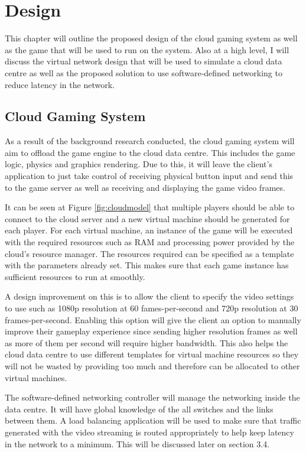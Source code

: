 \chapter{Design}
\label{chapter3}
This chapter will outline the proposed design of the cloud gaming system as well as the game that will be used to run on the system. Also at a high level, I will discuss the virtual network design that will be used to simulate a cloud data centre as well as the proposed solution to use software-defined networking to reduce latency in the network.

\section{Cloud Gaming System}
As a result of the background research conducted, the cloud gaming system will aim to offload the game engine to the cloud data centre. This includes the game logic, physics and graphics rendering. Due to this, it will leave the client's application to just take control of receiving physical button input and send this to the game server as well as receiving and displaying the game video frames.
\newline
\par
It can be seen at Figure \ref{fig:cloudmodel} that multiple players should be able to connect to the cloud server and a new virtual machine should be generated for each player. For each virtual machine, an instance of the game will be executed with the required resources such as RAM and processing power provided by the cloud's resource manager. The resources required can be specified as a template with the parameters already set. This makes sure that each game instance has sufficient resources to run at smoothly.
\newline
\par
A design improvement on this is to allow the client to specify the video settings to use such as 1080p resolution at 60 fames-per-second and 720p resolution at 30 frames-per-second. Enabling this option will give the client an option to manually improve their gameplay experience since sending higher resolution frames as well as more of them per second will require higher bandwidth. This also helps the cloud data centre to use different templates for virtual machine resources so they will not be wasted by providing too much and therefore can be allocated to other virtual machines.
\newline
\par
The software-defined networking controller will manage the networking inside the data centre. It will have global knowledge of the all switches and the links between them. A load balancing application will be used to make sure that traffic generated with the video streaming is routed appropriately to help keep latency in the network to a minimum. This will be discussed later on section 3.4.
